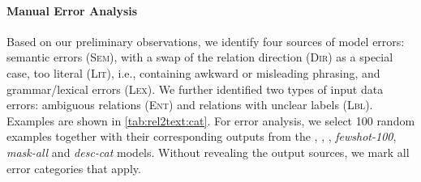 \paragraph{Manual Error Analysis} Based on our preliminary observations, we identify four sources of model errors: semantic errors (\textsc{Sem}), with a swap of the relation direction (\textsc{Dir}) as a special case, too literal (\textsc{Lit}), i.e., containing awkward or misleading phrasing, and grammar/lexical errors (\textsc{Lex}). We further identified two types of input data errors: ambiguous relations (\textsc{Ent}) and relations with unclear labels (\textsc{Lbl}). Examples are shown in \autoref{tab:rel2text:cat}.
For error analysis, we select 100 random examples together with their corresponding outputs from the \textit{\BARTr}, \textit{\BARTw}, \textit{\BARTk}, \textit{fewshot-100}, \textit{mask-all} and \textit{desc-cat} models. Without revealing the output sources, we mark all error categories that apply.
